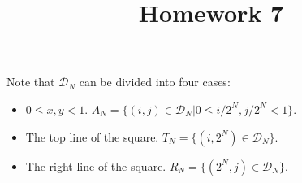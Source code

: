 \documentclass{homework}
\title{Homework 7}
\begin{document}
\maketitle

\begin{problem}{1}
Note that $\mathcal{D}_N$ can be divided into four cases:
\begin{itemize}
\item $0 \leq x, y < 1$.
      $A_N = \{(i, j) \in \mathcal{D}_N | 0 \leq i/2^N, j/2^N < 1\}$.
\item The top line of the square.
      $T_N = \{(i, 2^N) \in \mathcal{D}_N\}$.

\item The right line of the square.
      $R_N = \{(2^N, j) \in \mathcal{D}_N\}$.


\end{itemize}
\end{problem}
\end{document}
